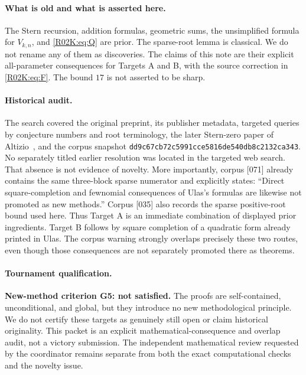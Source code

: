 \documentclass[11pt,a4paper]{article}
\begin{document}
\paragraph{What is old and what is asserted here.}
The Stern recursion, addition formulas, geometric sums, the unsimplified
formula for $V_{k,n}$, and \eqref{R02K:eq:Q} are prior. The sparse-root lemma is
classical. We do not rename any of them as discoveries. The claims of this
note are their explicit all-parameter consequences for Targets A and B,
with the source correction in \eqref{R02K:eq:F}. The bound $17$ is not asserted
to be sharp.

\paragraph{Historical audit.}
The search covered the original preprint, its publisher metadata, targeted
queries by conjecture numbers and root terminology, the later Stern-zero
paper of Altizio~\cite{R02K:Altizio}, and the corpus snapshot
\texttt{dd9c67cb72c5991cce5816de540db8c2132ca343}.
No separately titled earlier resolution was located in the targeted web
search. That absence is not evidence of novelty. More importantly, corpus
[071] already contains the same three-block sparse numerator and explicitly
states: ``Direct square-completion and fewnomial consequences of Ulas's
formulas are likewise not promoted as new methods.'' Corpus [035] also
records the sparse positive-root bound used here. Thus Target A is an
immediate combination of displayed prior ingredients. Target B follows
by square completion of a quadratic form already printed in Ulas.
The corpus warning strongly overlaps precisely these two routes, even
though those consequences are not separately promoted there as theorems.

\paragraph{Tournament qualification.}
\textbf{New-method criterion G5: not satisfied.} The proofs are
self-contained, unconditional, and global, but they introduce no new
methodological principle. We do not certify these targets as genuinely
still open or claim historical originality. This packet is an explicit
mathematical-consequence and overlap audit, not a victory submission.
The independent mathematical review requested by the coordinator remains
separate from both the exact computational checks and the novelty issue.
\endgroup


\clearpage
\end{document}
